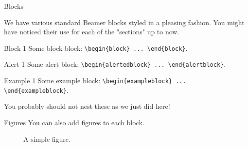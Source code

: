 \documentclass[final]{beamer}
\begin{document}
\begin{frame}[fragile]
\begin{columns}[t]
\separatorcolumn

\begin{column}{0.3\paperwidth}
\begin{block}{Blocks}

    We have various standard Beamer blocks styled in a pleasing fashion. You
    might have noticed their use for each of the "sections" up to now.

    \bigskip

    \begin{block}{Block 1}
        Some block block: \verb|\begin{block} ... \end{block}|.
    \end{block}

    \begin{alertblock}{Alert 1}
        Some alert block: \verb|\begin{alertedblock} ... \end{alertblock}|.
    \end{alertblock}

    \begin{exampleblock}{Example 1}
        Some example block: \verb|\begin{exampleblock} ... \end{exampleblock}|.
    \end{exampleblock}

    \bigskip

    You probably should not nest these as we just did here!
\end{block}

\begin{block}{Figures}
    You can also add figures to each block.
    \bigskip

    \begin{figure}
    \caption{A simple figure.}
    \end{figure}


\end{block}
\end{column}
\end{columns}
\end{frame}
\end{document}
